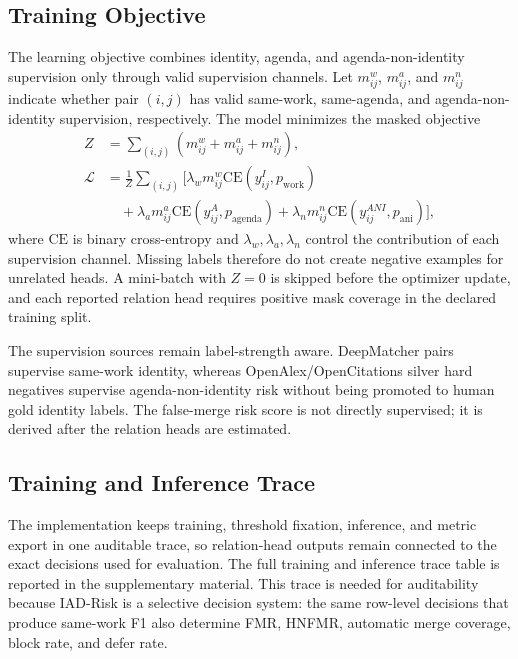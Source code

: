 \documentclass[preprint,12pt]{elsarticle}
\begin{document}
\subsection{Training Objective}

The learning objective combines identity, agenda, and agenda-non-identity supervision only through valid supervision channels. Let $m^w_{ij}$, $m^a_{ij}$, and $m^n_{ij}$ indicate whether pair $(i,j)$ has valid same-work, same-agenda, and agenda-non-identity supervision, respectively. The model minimizes the masked objective
\[
\begin{aligned}
Z &= \sum_{(i,j)}(m^w_{ij}+m^a_{ij}+m^n_{ij}),\\
\mathcal{L} &= \frac{1}{Z}\sum_{(i,j)}\bigl[
\lambda_w m^w_{ij}\mathrm{CE}(y^I_{ij}, p_{\mathrm{work}})\\
&\quad + \lambda_a m^a_{ij}\mathrm{CE}(y^A_{ij}, p_{\mathrm{agenda}})
+ \lambda_n m^n_{ij}\mathrm{CE}(y^{ANI}_{ij}, p_{\mathrm{ani}})
\bigr],
\end{aligned}
\]
where $\mathrm{CE}$ is binary cross-entropy and $\lambda_w,\lambda_a,\lambda_n$ control the contribution of each supervision channel. Missing labels therefore do not create negative examples for unrelated heads. A mini-batch with $Z=0$ is skipped before the optimizer update, and each reported relation head requires positive mask coverage in the declared training split.

The supervision sources remain label-strength aware. DeepMatcher pairs supervise same-work identity, whereas OpenAlex/OpenCitations silver hard negatives supervise agenda-non-identity risk without being promoted to human gold identity labels. The false-merge risk score is not directly supervised; it is derived after the relation heads are estimated.

\subsection{Training and Inference Trace}

The implementation keeps training, threshold fixation, inference, and metric export in one auditable trace, so relation-head outputs remain connected to the exact decisions used for evaluation. The full training and inference trace table is reported in the supplementary material. This trace is needed for auditability because IAD-Risk is a selective decision system: the same row-level decisions that produce same-work F1 also determine FMR, HNFMR, automatic merge coverage, block rate, and defer rate.
\end{document}
